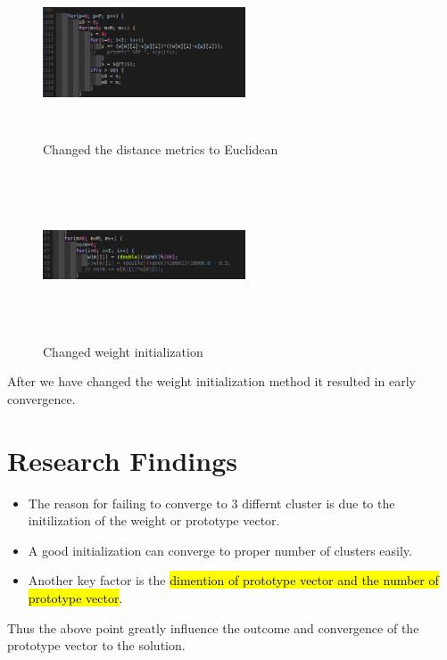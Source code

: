 \documentclass{article}
\begin{document}
\begin{figure}
  \centering
  \includegraphics[width=6cm, height=5cm]{weight.png}
  \caption{Changed the distance metrics to Euclidean}
\end{figure}


\begin{figure}
  \centering
  \includegraphics[width=6cm, height=5cm]{Random.png}
  \caption{Changed weight initialization}
\end{figure}

After we have changed the weight initialization method it resulted in early
convergence. 


\section{Research Findings}

\begin{itemize}
  \item The reason for failing to converge to 3 differnt cluster is due to the
initilization of the weight or prototype vector. 
   \item A good initialization can converge to proper number of  clusters easily.
   \item Another key factor is the \hl{dimention of prototype vector and the number
     of prototype vector}. 
\end{itemize}

Thus the above point greatly influence the outcome and convergence of the
prototype vector to the solution.
\end{document}
